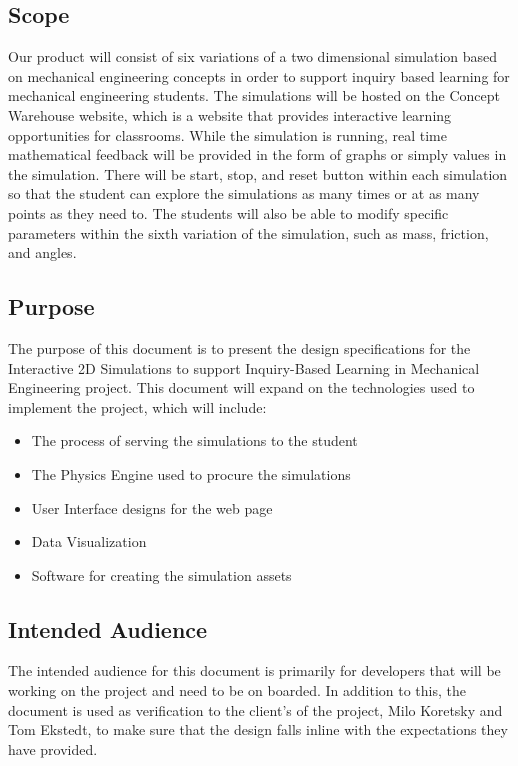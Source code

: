 \subsection{Scope}
Our product will consist of six variations of a two dimensional simulation based on mechanical engineering concepts in order to support inquiry based learning for mechanical engineering students. The simulations will be hosted on the Concept Warehouse website, which is a website that provides interactive learning opportunities for classrooms. While the simulation is running, real time mathematical feedback will be provided in the form of graphs or simply values in the simulation. There will be start, stop, and reset button within each simulation so that the student can explore the simulations as many times or at as many points as they need to. The students will also be able to modify specific parameters within the sixth variation of the simulation, such as mass, friction, and angles.

\subsection{Purpose}
The purpose of this document is to present the design specifications for the Interactive 2D Simulations to support Inquiry-Based Learning in Mechanical Engineering project. This document will expand on the technologies used to implement the project, which will include:

\begin{itemize}
  \item The process of serving the simulations to the student
  \item The Physics Engine used to procure the simulations
  \item User Interface designs for the web page
  \item Data Visualization
  \item Software for creating the simulation assets
\end{itemize} 

\subsection{Intended Audience}
The intended audience for this document is primarily for developers that will be working on the project and need to be on boarded. In addition to this, the document is used as verification to the client's of the project, Milo Koretsky and Tom Ekstedt, to make sure that the design falls inline with the expectations they have provided.


